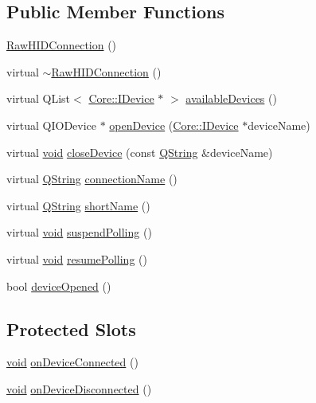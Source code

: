\subsection*{\-Public \-Member \-Functions}
\begin{DoxyCompactItemize}
\item 
\hyperlink{group___raw_h_i_d_plugin_gaa6d75047d32946b3823a1cfe7b4d7328}{\-Raw\-H\-I\-D\-Connection} ()
\item 
virtual \hyperlink{group___raw_h_i_d_plugin_ga5d3dcc8e69d09013ff84a3412f1ccee7}{$\sim$\-Raw\-H\-I\-D\-Connection} ()
\item 
virtual \-Q\-List$<$ \hyperlink{class_core_1_1_i_device}{\-Core\-::\-I\-Device} $\ast$ $>$ \hyperlink{group___raw_h_i_d_plugin_ga9a33750f32a6e48ba7463beaacf3696d}{available\-Devices} ()
\item 
virtual \-Q\-I\-O\-Device $\ast$ \hyperlink{group___raw_h_i_d_plugin_ga861af14dd75658d985780004160aefa2}{open\-Device} (\hyperlink{class_core_1_1_i_device}{\-Core\-::\-I\-Device} $\ast$device\-Name)
\item 
virtual \hyperlink{group___u_a_v_objects_plugin_ga444cf2ff3f0ecbe028adce838d373f5c}{void} \hyperlink{group___raw_h_i_d_plugin_ga80b9d6de6f0e054368bb3d920aa36de4}{close\-Device} (const \hyperlink{group___u_a_v_objects_plugin_gab9d252f49c333c94a72f97ce3105a32d}{\-Q\-String} \&device\-Name)
\item 
virtual \hyperlink{group___u_a_v_objects_plugin_gab9d252f49c333c94a72f97ce3105a32d}{\-Q\-String} \hyperlink{group___raw_h_i_d_plugin_ga753e060b5d2c26ebd344c084750bf715}{connection\-Name} ()
\item 
virtual \hyperlink{group___u_a_v_objects_plugin_gab9d252f49c333c94a72f97ce3105a32d}{\-Q\-String} \hyperlink{group___raw_h_i_d_plugin_gadf376fe560ac0b2e750fd4797139f602}{short\-Name} ()
\item 
virtual \hyperlink{group___u_a_v_objects_plugin_ga444cf2ff3f0ecbe028adce838d373f5c}{void} \hyperlink{group___raw_h_i_d_plugin_gac46703708a7e43cffa7712ebab818ba0}{suspend\-Polling} ()
\item 
virtual \hyperlink{group___u_a_v_objects_plugin_ga444cf2ff3f0ecbe028adce838d373f5c}{void} \hyperlink{group___raw_h_i_d_plugin_gabe7a095aa167ae8addf65d14e2dcc460}{resume\-Polling} ()
\item 
bool \hyperlink{group___raw_h_i_d_plugin_ga9bd370fd09da409d89f1dd7612d482cb}{device\-Opened} ()
\end{DoxyCompactItemize}
\subsection*{\-Protected \-Slots}
\begin{DoxyCompactItemize}
\item 
\hyperlink{group___u_a_v_objects_plugin_ga444cf2ff3f0ecbe028adce838d373f5c}{void} \hyperlink{group___raw_h_i_d_plugin_gae6fbe6bf878bf78034b81d648fd25edb}{on\-Device\-Connected} ()
\item 
\hyperlink{group___u_a_v_objects_plugin_ga444cf2ff3f0ecbe028adce838d373f5c}{void} \hyperlink{group___raw_h_i_d_plugin_gaf84655a7cf624587cf336b550e8c0045}{on\-Device\-Disconnected} ()
\end{DoxyCompactItemize}
